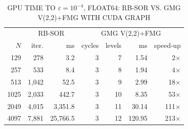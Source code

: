 \begin{table}[t]
\centering
\caption{GPU TIME TO $\varepsilon = 10^{-4}$, FLOAT64: RB-SOR VS. GMG V(2,2)+FMG WITH CUDA GRAPH}
\label{tab:gmg}
\begin{tabular}{rrrrrrr}
\hline
\multicolumn{1}{c}{} & \multicolumn{2}{c}{RB-SOR} & \multicolumn{4}{c}{GMG V(2,2)+FMG} \\
$N$ & iter. & ms & cycles & levels & ms & speed-up \\
\hline
129  & 278   & 3.2      & 3 & 7  & 1.54   & 2$\times$   \\
257  & 533   & 8.4      & 3 & 8  & 1.94   & 4$\times$   \\
513  & 1,042 & 52.5     & 3 & 9  & 2.99   & 18$\times$  \\
1025 & 2,033 & 442.7    & 3 & 10 & 8.35   & 53$\times$  \\
2049 & 4,015 & 3,351.8  & 3 & 11 & 30.14  & 111$\times$ \\
4097 & 7,881 & 25,766.5 & 3 & 12 & 120.95 & 213$\times$ \\
\hline
\end{tabular}
\end{table}
